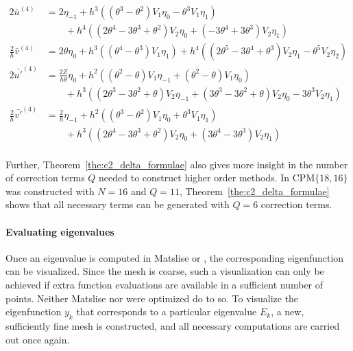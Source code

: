 \begin{align*}
    2\bar{u}^{(4)}            & = 2 \eta_{-1} + h^{3}\left(\left(\theta^{3} - \theta^{2}\right) V_{1} \eta_{0} -\theta^{3} V_{1} \eta_{1}\right)                                                                                                 \\
                              & \quad\quad + h^{4}\left(\left(2 \theta^{4} - 3 \theta^{3} + \theta^{2}\right) V_{2} \eta_{0} + \left(-3 \theta^{4} + 3 \theta^{3}\right) V_{2} \eta_{1}\right)                                                   \\
    \frac{2}{h}\bar{v}^{(4)}  & = 2 \theta \eta_{0} + h^{3}\left(\left(\theta^{4} - \theta^{3}\right) V_{1} \eta_{1}\right) + h^{4}\left(\left(2 \theta^{5} - 3 \theta^{4} + \theta^{3}\right) V_{2} \eta_{1} - \theta^{5} V_{2} \eta_{2}\right) \\
    2\bar{u'}^{(4)}           & = \frac{2Z}{h\theta} \eta_0 + h^{2}\left(\left(\theta^{2} - \theta\right) V_{1} \eta_{-1} + \left(\theta^{2} - \theta\right) V_{1} \eta_{0}\right)                                                               \\
                              & \quad\quad+ h^{3}\left(\left(2 \theta^{3} - 3 \theta^{2} + \theta\right) V_{2} \eta_{-1} + \left(3 \theta^{3} - 3 \theta^{2} + \theta\right) V_{2} \eta_{0} - 3 \theta^{3} V_{2} \eta_{1}\right)                 \\
    \frac{2}{h}\bar{v'}^{(4)} & = \frac{2}{h} \eta_{-1} + h^{2}\left(\left(\theta^{3} - \theta^{2}\right) V_{1} \eta_{0} + \theta^{3} V_{1} \eta_{1}\right)                                                                                      \\
                              & \quad\quad + h^{3}\left(\left(2 \theta^{4} - 3 \theta^{3} + \theta^{2}\right) V_{2} \eta_{0} + \left(3 \theta^{4} - 3 \theta^{3}\right) V_{2} \eta_{1}\right)                                                    \\
\end{align*}%

Further, Theorem~\ref{the:c2_delta_formulae} also gives more insight in the number of correction terms $Q$ needed to construct higher order methods. In  $\text{CPM}\{18, 16\}$ was constructed with $N=16$ and $Q=11$, Theorem~\ref{the:c2_delta_formulae} shows that all necessary terms can be generated with $Q=6$ correction terms.


\paragraph{Evaluating eigenvalues}
Once an eigenvalue is computed in Matslise or , the corresponding eigenfunction can be visualized. Since the mesh is coarse, such a visualization can only be achieved if extra function evaluations are available in a sufficient number of points. Neither Matslise nor  were optimized do to so. To visualize the eigenfunction $y_k$ that corresponds to a particular eigenvalue $E_k$, a new, sufficiently fine mesh is constructed, and all necessary computations are carried out once again.

